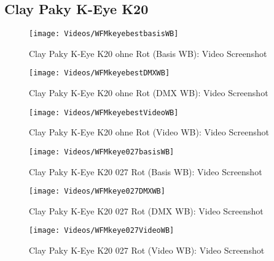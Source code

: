 \documentclass[pagesize,paper=A4,fontsize=12pt,utf8,numbers=noenddot,bibliography=totoc,listof=totoc,DIV=11,BCOR=1mm]{scrreprt}
\begin{document}
\subsection{Clay Paky K-Eye K20}

\begin{figure}[htp]     %
\centering
\texttt{[image: Videos/WFMkeyebestbasisWB]} 
\caption {Clay Paky K-Eye K20 ohne Rot (Basis WB): Video Screenshot} 
\end{figure}

\begin{figure}[htp]     %
\centering
\texttt{[image: Videos/WFMkeyebestDMXWB]} 
\caption {Clay Paky K-Eye K20 ohne Rot (DMX WB): Video Screenshot} 
\end{figure}

\begin{figure}[htp]     %
\centering
\texttt{[image: Videos/WFMkeyebestVideoWB]} 
\caption {Clay Paky K-Eye K20 ohne Rot (Video WB): Video Screenshot} 
\end{figure}



\begin{figure}[htp]     %
\centering
\texttt{[image: Videos/WFMkeye027basisWB]} 
\caption {Clay Paky K-Eye K20 027 Rot (Basis WB): Video Screenshot} 
\end{figure}

\begin{figure}[htp]     %
\centering
\texttt{[image: Videos/WFMkeye027DMXWB]} 
\caption {Clay Paky K-Eye K20 027 Rot (DMX WB): Video Screenshot} 
\end{figure}

\begin{figure}[htp]     %
\centering
\texttt{[image: Videos/WFMkeye027VideoWB]} 
\caption {Clay Paky K-Eye K20 027 Rot (Video WB): Video Screenshot} 
\end{figure}
\end{document}
